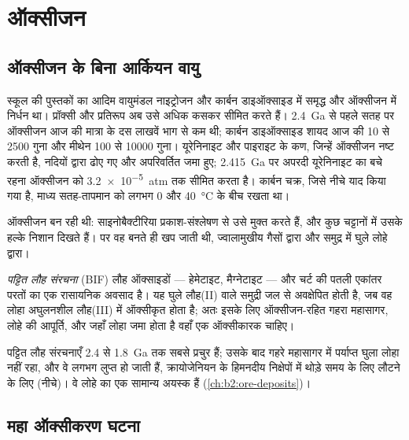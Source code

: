 \section{ऑक्सीजन}\label{sec:b2:precambrian-earth:oxygen}

\subsection*{ऑक्सीजन के बिना आर्कियन वायु}

स्कूल की पुस्तकों का आदिम वायुमंडल नाइट्रोजन और कार्बन डाइऑक्साइड में समृद्ध और
ऑक्सीजन में निर्धन था। प्रॉक्सी और प्रतिरूप अब उसे अधिक कसकर सीमित करते हैं। \qty{2.4}{Ga} से पहले सतह पर ऑक्सीजन
आज की मात्रा के दस लाखवें भाग से कम थी; कार्बन डाइऑक्साइड शायद आज की 10 से 2500
गुना और मीथेन 100 से \num{10000} गुना। यूरेनिनाइट और पाइराइट के कण, जिन्हें
ऑक्सीजन नष्ट करती है,  नदियों द्वारा ढोए गए और अपरिवर्तित जमा हुए; \qty{2.415}{Ga} पर
अपरदी यूरेनिनाइट का बचे रहना ऑक्सीजन को \qty{3.2e-5}{atm} तक सीमित करता है। कार्बन चक्र, जिसे
नीचे याद किया गया है, माध्य सतह-तापमान को लगभग 0 और \qty{40}{\celsius} के बीच रखता था।

ऑक्सीजन बन रही थी: साइनोबैक्टीरिया प्रकाश-संश्लेषण से उसे मुक्त करते हैं, और कुछ  चट्टानों में
उसके हल्के निशान दिखते हैं। पर वह बनते ही खप जाती थी, ज्वालामुखीय गैसों द्वारा और समुद्र में घुले
लोहे द्वारा।

\begin{definition}[पट्टित लौह संरचना]\label{def:b2:precambrian-earth:bif}
\emph{पट्टित लौह संरचना}
(BIF) लौह ऑक्साइडों --- हेमेटाइट, मैग्नेटाइट --- और
चर्ट की पतली एकांतर परतों का एक रासायनिक अवसाद है। यह घुले लौह(II) वाले समुद्री जल से
अवक्षेपित होती है, जब वह लोहा अघुलनशील लौह(III) में ऑक्सीकृत होता है; अतः इसके लिए ऑक्सीजन-रहित
गहरा महासागर, लोहे की आपूर्ति, और जहाँ लोहा जमा होता है वहाँ एक ऑक्सीकारक चाहिए।
\end{definition}

पट्टित लौह संरचनाएँ 2.4 से \qty{1.8}{Ga} तक सबसे प्रचुर हैं; उसके बाद गहरे महासागर में
पर्याप्त घुला लोहा नहीं रहा, और वे लगभग लुप्त हो जाती हैं, क्रायोजेनियन के हिमनदीय निक्षेपों में
थोड़े समय के लिए लौटने के लिए (नीचे)। वे लोहे का एक सामान्य अयस्क हैं
(\cref{ch:b2:ore-deposits})।

\subsection*{महा ऑक्सीकरण घटना}

